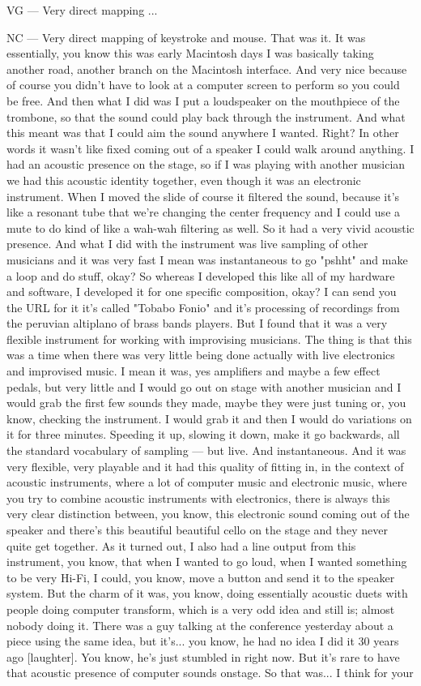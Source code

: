 VG — Very direct mapping ... 

NC — Very direct mapping of keystroke and mouse. That was it. It was essentially, you know this was early Macintosh days I was basically taking another road, another branch on the Macintosh interface. And very nice because of course you didn't have to look at a computer screen to perform so you could be free. And then what I did was I put a loudspeaker on the mouthpiece of the trombone, so that the sound could play back through the instrument. And what this meant was that I could aim the sound anywhere I wanted. Right? In other words it wasn't like fixed coming out of a speaker I could walk around anything. I had an acoustic presence on the stage, so if I was playing with another musician we had this acoustic identity together, even though it was an electronic instrument. When I moved the slide of course it filtered the sound, because it's like a resonant tube that we're changing the center frequency and I could use a mute to do kind of like a wah-wah filtering as well. So it had a very vivid acoustic presence. And what I did with the instrument was live sampling of other musicians and it was very fast I mean was instantaneous to go "pshht" and make a loop and do stuff, okay? So whereas I developed this like all of my hardware and software, I developed it for one specific composition, okay? I can send you the URL for it it's called "Tobabo Fonio" and it's processing of recordings from the peruvian altiplano of brass bands players. But I found that it was a very flexible instrument for working with improvising musicians. The thing is that this was a time when there was very little being done actually with live electronics and improvised music. I mean it was, yes amplifiers and maybe a few effect pedals, but very little and I would go out on stage with another musician and I would grab the first few sounds they made, maybe they were just tuning or, you know, checking the instrument. I would grab it and then I would do variations on it for three minutes. Speeding it up, slowing it down, make it go backwards, all the standard vocabulary of sampling — but live. And instantaneous. And it was very flexible, very playable and it had this quality of fitting in, in the context of acoustic instruments, where a lot of computer music and electronic music, where you try to combine acoustic instruments with electronics, there is always this very clear distinction between, you know, this electronic sound coming out of the speaker and there's this beautiful beautiful cello on the stage and they never quite get together. As it turned out, I also had a line output from this instrument, you know, that when I wanted to go loud, when I wanted something to be very Hi-Fi, I could, you know, move a button and send it to the speaker system. But the charm of it was, you know, doing essentially acoustic duets with people doing computer transform, which is a very odd idea and still is; almost nobody doing it. There was a guy talking at the conference yesterday about a piece using the same idea, but it's... you know, he had no idea I did it 30 years ago [laughter]. You know, he's just stumbled in right now. But it's rare to have that acoustic presence of computer sounds onstage. So that was... I think for your 